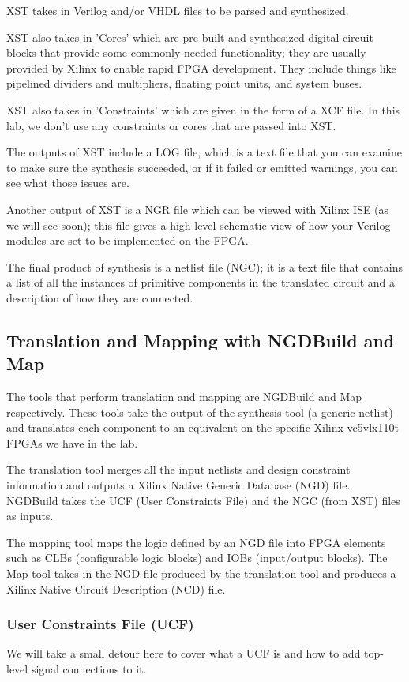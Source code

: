 \documentclass[11pt]{article}
\begin{document}
XST takes in Verilog and/or VHDL files to be parsed and synthesized.

XST also takes in 'Cores' which are pre-built and synthesized digital circuit blocks that provide some commonly needed functionality; they are usually provided by Xilinx to enable rapid FPGA development. They include things like pipelined dividers and multipliers, floating point units, and system buses.

XST also takes in 'Constraints' which are given in the form of a XCF file. In this lab, we don't use any constraints or cores that are passed into XST.

The outputs of XST include a LOG file, which is a text file that you can examine to make sure the synthesis succeeded, or if it failed or emitted warnings, you can see what those issues are.

Another output of XST is a NGR file which can be viewed with Xilinx ISE (as we will see soon); this file gives a high-level schematic view of how your Verilog modules are set to be implemented on the FPGA.

The final product of synthesis is a netlist file (NGC); it is a text file that contains a list of all the instances of primitive components in the translated circuit and a description of how they are connected.

\subsection{Translation and Mapping with NGDBuild and Map}
The tools that perform translation and mapping are NGDBuild and Map respectively. These tools take the output of the synthesis tool (a generic netlist) and translates each component to an equivalent on the specific Xilinx vc5vlx110t FPGAs we have in the lab. 

The translation tool merges all the input netlists and design constraint information and outputs a Xilinx Native Generic Database (NGD) file. NGDBuild takes the UCF (User Constraints File) and the NGC (from XST) files as inputs.

The mapping tool maps the logic defined by an NGD file into FPGA elements such as CLBs (configurable logic blocks) and IOBs (input/output blocks). The Map tool takes in the NGD file produced by the translation tool and produces a Xilinx Native Circuit Description (NCD) file.

\subsubsection{User Constraints File (UCF)}
We will take a small detour here to cover what a UCF is and how to add top-level signal connections to it.
\end{document}
